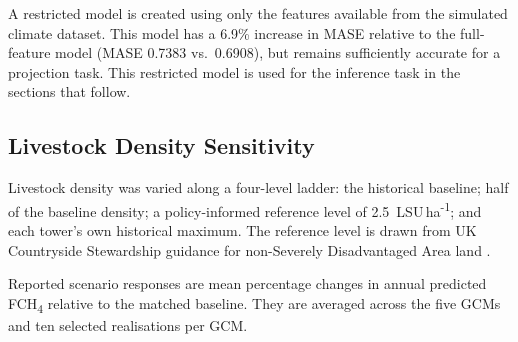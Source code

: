 A restricted model is created using only the features available from the simulated climate
dataset. This model has a 6.9\% increase in MASE relative to the full-feature model (MASE
0.7383 vs.\ 0.6908), but remains sufficiently accurate for a projection task. This restricted
model is used for the inference task in the sections that follow.


\subsection{Livestock Density Sensitivity}

Livestock density was varied along a four-level ladder: the historical baseline; half of the
baseline density; a policy-informed reference level of 2.5~LSU\,ha\textsuperscript{-1}; and each
tower's own historical maximum. The reference level is drawn from UK Countryside Stewardship
guidance for non-Severely Disadvantaged Area land \cite{defra2022stewardship}.

Reported scenario responses are mean percentage changes in annual predicted
FCH\textsubscript{4} relative to the matched baseline. They are averaged across the five GCMs and
ten selected realisations per GCM.

